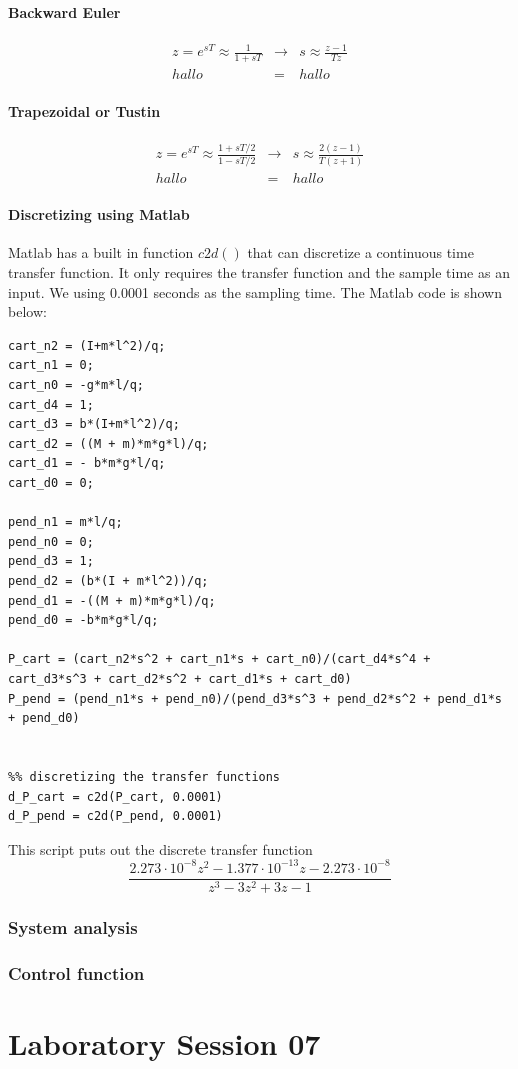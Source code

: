 	\subsection{Backward Euler}
		
		\begin{eqnarray}
			z = e^{sT} \approx \frac{1}{1 + sT} &\rightarrow& s \approx \frac{z - 1}{Tz}\\
			hallo &=& hallo
		\end{eqnarray}
	
	\subsection{Trapezoidal or Tustin}
	
		\begin{eqnarray}
			z = e^{sT} \approx \frac{1 + sT/2}{1 - sT/2} &\rightarrow& s \approx \frac{2\left( z - 1\right) }{T\left( z+1\right) }\\
			hallo &=& hallo
		\end{eqnarray}
		
	\subsection{Discretizing using Matlab}
	Matlab has a built in function $c2d()$ that can discretize a continuous time transfer function. It only requires the transfer function and the sample time as an input. We using 0.0001 seconds as the sampling time. The Matlab code is shown below:
\begin{lstlisting}
cart_n2 = (I+m*l^2)/q;
cart_n1 = 0;
cart_n0 = -g*m*l/q;
cart_d4 = 1;
cart_d3 = b*(I+m*l^2)/q;
cart_d2 = ((M + m)*m*g*l)/q;
cart_d1 = - b*m*g*l/q;
cart_d0 = 0;

pend_n1 = m*l/q;
pend_n0 = 0;
pend_d3 = 1;
pend_d2 = (b*(I + m*l^2))/q;
pend_d1 = -((M + m)*m*g*l)/q;
pend_d0 = -b*m*g*l/q;

P_cart = (cart_n2*s^2 + cart_n1*s + cart_n0)/(cart_d4*s^4 + cart_d3*s^3 + cart_d2*s^2 + cart_d1*s + cart_d0)
P_pend = (pend_n1*s + pend_n0)/(pend_d3*s^3 + pend_d2*s^2 + pend_d1*s + pend_d0)


%% discretizing the transfer functions
d_P_cart = c2d(P_cart, 0.0001)
d_P_pend = c2d(P_pend, 0.0001)

\end{lstlisting}

This script puts out the discrete transfer function
\begin{equation}
	\frac{2.273\cdot 10^{-8}z^2-1.377\cdot 10^{-13} z-2.273\cdot 10^{-8}}{z^3-3z^2+3z-1}
\end{equation}
\section{System analysis}


\section{Control function}

\part{Laboratory Session 07}


